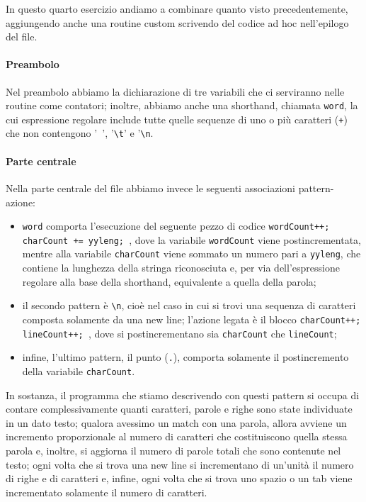 \documentclass[class=book, crop=false, oneside, 12pt]{standalone}
\begin{document}

In questo quarto esercizio andiamo a combinare quanto visto precedentemente, aggiungendo anche una routine custom scrivendo del codice ad hoc nell'epilogo del file.

\paragraph{Preambolo}
Nel preambolo abbiamo la dichiarazione di tre variabili che ci serviranno nelle routine come contatori; inoltre, abbiamo anche una shorthand, chiamata \texttt{word}, la cui espressione regolare include tutte quelle sequenze di uno o più caratteri (\texttt{+}) che non contengono '\texttt{ }', '\texttt{\textbackslash t}' e '\texttt{\textbackslash n}.

\paragraph{Parte centrale}
Nella parte centrale del file abbiamo invece le seguenti associazioni pattern-azione:

\begin{itemize}
    \item \texttt{word} comporta l'esecuzione del seguente pezzo di codice \texttt{{wordCount++; charCount += yyleng; }}, dove la variabile \texttt{wordCount} viene postincrementata, mentre alla variabile \texttt{charCount} viene sommato un numero pari a \texttt{yyleng}, che contiene la lunghezza della stringa riconosciuta e, per via dell'espressione regolare alla base della shorthand, equivalente a quella della parola;
    \item il secondo pattern è \texttt{\textbackslash n}, cioè nel caso in cui si trovi una sequenza di caratteri composta solamente da una new line; l'azione legata è il blocco \texttt{{charCount++; lineCount++; }}, dove si postincrementano sia \texttt{charCount} che \texttt{lineCount};
    \item infine, l'ultimo pattern, il punto (\texttt{.}), comporta solamente il postincremento della variabile \texttt{charCount}.
\end{itemize}

In sostanza, il programma che stiamo descrivendo con questi pattern si occupa di contare complessivamente quanti caratteri, parole e righe sono state individuate in un dato testo; qualora avessimo un match con una parola, allora avviene un incremento proporzionale al numero di caratteri che costituiscono quella stessa parola e, inoltre, si aggiorna il numero di parole totali che sono contenute nel testo; ogni volta che si trova una new line si incrementano di un'unità il numero di righe e di caratteri e, infine, ogni volta che si trova uno spazio o un tab viene incrementato solamente il numero di caratteri. 
\end{document}
